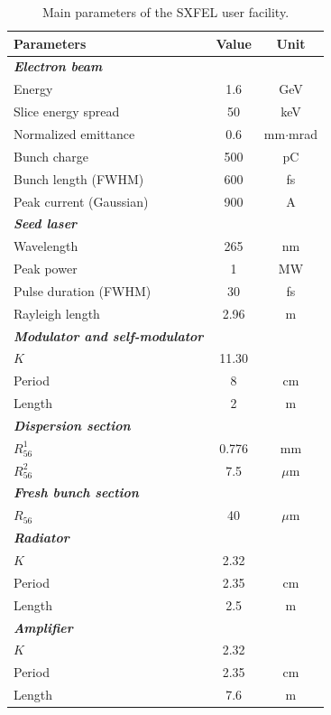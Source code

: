 \documentclass[%
 reprint,
 amsmath,amssymb,
 aps,
]{revtex4-2}
\begin{document}
\begin{table}
	\caption{\label{tab:table1}Main parameters of the SXFEL user facility.}
	\begin{ruledtabular}
    \begin{tabular}{lcc}
    Parameters				&Value	&Unit\\ \hline
    {\textbf{\textit{Electron beam}}}&		&\\
    Energy					&1.6		&GeV\\
    Slice energy spread 	&50     	&keV\\
    Normalized emittance  	&0.6	        &mm$\cdot$mrad\\
    Bunch charge			&500	    &pC\\
    Bunch length (FWHM)		&600    	&fs\\
    Peak current (Gaussian) &900	    &A\\
    {\textbf{\textit{Seed laser}}}&		&\\
    Wavelength                  &265		&nm\\
    Peak power  &1		&MW\\
    Pulse duration (FWHM)    	&30     	&fs\\
    Rayleigh length           	&2.96	        &m\\
    {\textbf{\textit{Modulator and self-modulator}}}&		&\\
    $K$                         &11.30		&\\
    Period                      &8		    &cm\\
    Length                      &2		&m\\
    {\textbf{\textit{Dispersion section}}}&		&\\
    $R_{56}^{1}$                         &0.776		&mm\\
    $R_{56}^{2}$                      &7.5		    &$\mu$m\\
    {\textbf{\textit{Fresh bunch section}}}&		&\\
    $R_{56}$                         &40		&$\mu$m\\
    {\textbf{\textit{Radiator}}}&		&\\
    $K$                         &2.32		&\\
    Period                     	&2.35     	&cm\\
    Length           	        &2.5	        &m\\
    {\textbf{\textit{Amplifier}}}&		&\\
    $K$                         &2.32		&\\
    Period                     	&2.35     	&cm\\
    Length           	        &7.6	        &m\\
    \end{tabular}
    \end{ruledtabular}
\end{table}
\end{document}
